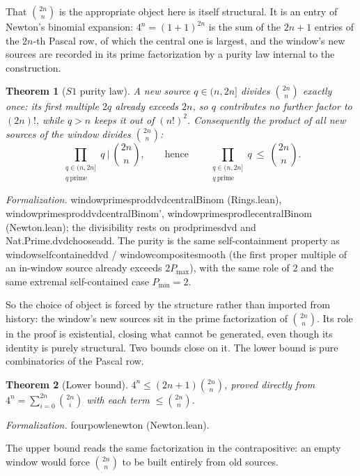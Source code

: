 \documentclass[11pt,a4paper]{amsart}
\theoremstyle{plain}
\newtheorem{theorem}{Theorem}[section]
\theoremstyle{definition}
\theoremstyle{plain}
\theoremstyle{remark}
\newcommand{\lean}[1]{\begingroup\upshape\ttfamily\def\_{\textunderscore\allowbreak}#1\endgroup}
\newcommand{\Formal}[1]{\par\smallskip\noindent\begingroup\raggedright\emph{Formalization.} #1\par\endgroup\smallskip}
\begin{document}
That $\binom{2n}{n}$ is the appropriate object here is itself structural. It is an entry of
Newton's binomial expansion: $4^n=(1+1)^{2n}$ is the sum of the $2n+1$ entries of the $2n$-th
Pascal row, of which the central one is largest, and the window's new sources are recorded in
its prime factorization by a purity law internal to the construction.

\begin{theorem}[$S1$ purity law]\label{thm:s1}
A new source $q\in(n,2n]$ divides $\binom{2n}{n}$ exactly once: its first multiple $2q$
already exceeds $2n$, so $q$ contributes no further factor to $(2n)!$, while $q>n$ keeps it out
of $(n!)^2$.
Consequently the product of all new sources of the window divides $\binom{2n}{n}$:
\[
\prod_{\substack{q\in(n,2n]\\ q\ \text{prime}}} q \ \Big|\ \binom{2n}{n},
\qquad\text{hence}\qquad
\prod_{\substack{q\in(n,2n]\\ q\ \text{prime}}} q \ \le\ \binom{2n}{n}.
\]
\end{theorem}

\Formal{\lean{window\_primes\_prod\_dvd\_centralBinom} (\lean{Rings.lean}),
\lean{window\_primes\_prod\_dvd\_centralBinom'},
\lean{window\_primes\_prod\_le\_centralBinom} (\lean{Newton.lean}); the
divisibility rests on \lean{prod\_primes\_dvd} and
\lean{Nat.Prime.dvd\_choose\_add}. The purity is the same self-containment property as
\lean{window\_self\_contained\_dvd} / \lean{window\_composite\_smooth} (the first proper
multiple of an in-window source already exceeds $2P_{\max}$), with the same role of $2$ and
the same extremal self-contained case $P_{\min}=2$.}

So the choice of object is forced by the structure rather than imported from history: the
window's new sources sit in the prime factorization of $\binom{2n}{n}$. Its role in the
proof is existential, closing what cannot be generated, even though its identity is purely
structural. Two bounds close on it. The lower bound is pure combinatorics of the Pascal row.

\begin{theorem}[Lower bound]\label{thm:lower}
$4^n\le(2n+1)\binom{2n}{n}$, proved directly from
$4^n=\sum_{i=0}^{2n}\binom{2n}{i}$ with each term $\le\binom{2n}{n}$.
\end{theorem}

\Formal{\lean{four\_pow\_le\_newton} (\lean{Newton.lean}).}

The upper bound reads the same factorization in the contrapositive: an empty window would
force $\binom{2n}{n}$ to be built entirely from old sources.
\end{document}
